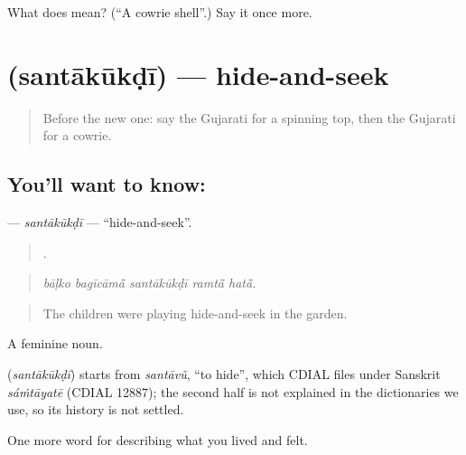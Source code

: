 \begin{tcolorbox}[breakable,colback=teal!4,colframe=teal!35!black,title={Before you move on}]
What does  mean? (\textquotedblleft{}A cowrie shell\textquotedblright{}.) Say it once more.
\end{tcolorbox}
\section[\texorpdfstring{\gu{સંતાકૂકડી} (santākūkḍī)}{સંતાકૂકડી (santākūkḍī)}]{ (santākūkḍī) — hide-and-seek}

\label{lesson:GU-C524-santakukdi}



\begin{quote}
Before the new one: say the Gujarati for a spinning top, then the Gujarati for a cowrie.
\end{quote}

\subsection*{You'll want to know: }
\textbf{} — \emph{santākūkḍī} — \textquotedblleft{}hide-and-seek\textquotedblright{}.

\begin{quote}
    .
\end{quote}

\begin{quote}
\emph{bāḷko bagīcāmā̃ santākūkḍī ramtā̃ hatā̃.}
\end{quote}

\begin{quote}
The children were playing hide-and-seek in the garden.
\end{quote}

A feminine noun.

\begin{cousinweb}
\textbf{} (\emph{santākūkḍī}) starts from \emph{santāvũ}, \textquotedblleft{}to hide\textquotedblright{}, which CDIAL files under Sanskrit \emph{sáṁtāyatē} (CDIAL 12887); the second half is not explained in the dictionaries we use, so its history is not settled.
\end{cousinweb}

\begin{grammarlens}[title={What you've built}]
One more word for describing what you lived and felt.
\end{grammarlens}

